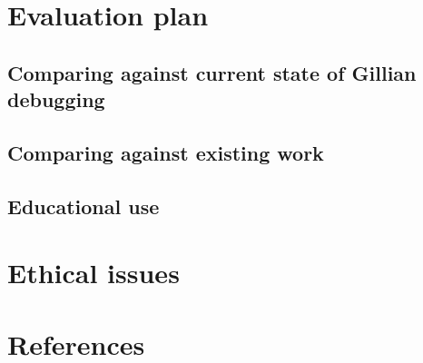 \documentclass[a4paper, twoside]{report}
\begin{document}
\chapter{Evaluation plan}
\section{Comparing against current state of Gillian debugging}
\section{Comparing against existing work}
\section{Educational use}

\chapter{Ethical issues}



\chapter{References}
\end{document}
